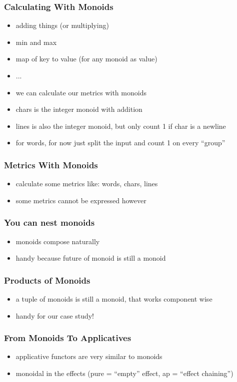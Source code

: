 \documentclass{beamer}
\begin{document}
\begin{frame}
  \frametitle{Calculating With Monoids}
  \begin{itemize}

  \item adding things (or multiplying)
  \item min and max
  \item map of key to value (for any monoid as value)
  \item ...
  \item we can calculate our metrics with monoids
  \item chars is the integer monoid with addition
  \item lines is also the integer monoid, but only count 1 if char is a newline
  \item for words, for now just split the input and count 1 on every ``group''
  \end{itemize}
\end{frame}

\begin{frame}
  \frametitle{Metrics With Monoids}
  \begin{itemize}
  \item calculate some metrics like: words, chars, lines
  \item some metrics cannot be expressed however
  \end{itemize}
\end{frame}

\begin{frame}
  \frametitle{You can nest monoids}
  \begin{itemize}
  \item monoids compose naturally
  \item handy because future of monoid is still a monoid
  \end{itemize}
\end{frame}

\begin{frame}
  \frametitle{Products of Monoids}
  \begin{itemize}
  \item a tuple of monoids is still a monoid, that works component wise
  \item handy for our case study!
  \end{itemize}
\end{frame}

\begin{frame}
  \frametitle{From Monoids To Applicatives}
  \begin{itemize}
  \item applicative functors are very similar to monoids
  \item monoidal in the effects (pure = ``empty'' effect, ap = ``effect chaining'')
  \end{itemize}
\end{frame}
\end{document}
